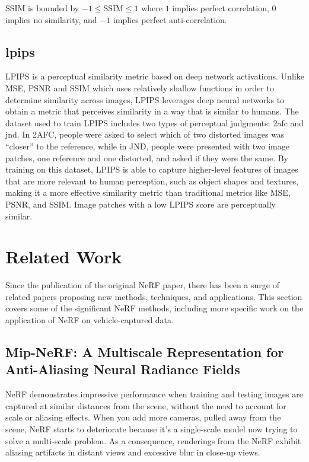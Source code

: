 SSIM is bounded by $-1 \leq \text{SSIM} \leq 1$ where $1$ implies perfect correlation, $0$ implies no similarity, and $-1$ implies perfect anti-correlation.


\subsection[LPIPS]{\acrfull{lpips}}
LPIPS \cite{zhang_unreasonable_2018} is a perceptual similarity metric based on deep network activations. Unlike MSE, PSNR and SSIM which uses relatively shallow functions in order to determine similarity across images, LPIPS leverages deep neural networks to obtain a metric that perceives similarity in a way that is similar to humans. The dataset used to train LPIPS includes two types of perceptual judgments: \acrfull{2afc} and \acrfull{jnd}. In 2AFC, people were asked to select which of two distorted images was “closer” to the reference, while in JND, people were presented with two image patches, one reference and one distorted, and asked if they were the same. By training on this dataset, LPIPS is able to capture higher-level features of images that are more relevant to human perception, such as object shapes and textures, making it a more effective similarity metric than traditional metrics like MSE, PSNR, and SSIM. Image patches with a low LPIPS score are perceptually similar.





\section{Related Work}
Since the publication of the original NeRF paper, there has been a surge of related papers proposing new methods, techniques, and applications. This section covers some of the significant NeRF methods, including more specific work on the application of NeRF on vehicle-captured data.

\subsection[Mip-NeRF]{Mip-NeRF: A Multiscale Representation for Anti-Aliasing Neural Radiance Fields} \label{sec:mipnerf}
NeRF demonstrates impressive performance when training and testing images are captured at similar distances from the scene, without the need to account for scale or aliasing effects. When you add more cameras, pulled away from the scene, NeRF starts to deteriorate because it's a single-scale model now trying to solve a multi-scale problem. As a consequence, renderings from the NeRF exhibit aliasing artifacts in distant views and excessive blur in close-up views.

